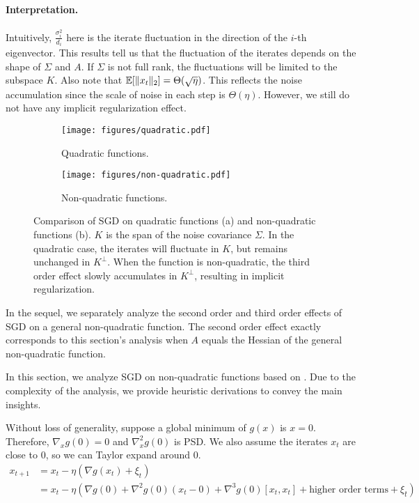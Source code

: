 \paragraph{Interpretation.} Intuitively, $\frac{\sigma_i^2}{d_i}$ here is the iterate fluctuation in the direction of the $i$-th eigenvector. This results tell us that the fluctuation of the iterates depends on the shape of $\Sigma$ and $A$. If $\Sigma$ is not full rank, the fluctuations will be limited to the subspace $K$. Also note that $\operatorname*{\mathbb{E}}[\|x_t\|_2] = \Theta(\sqrt{\eta})$. This reflects the noise accumulation since the scale of noise in each step is $\Theta({\eta})$. However, we still do not have any implicit regularization effect. 

\begin{figure}[ht]
\centering
 \begin{subfigure}[t]{0.45\textwidth}
        \texttt{[image: figures/quadratic.pdf]}
        \caption{Quadratic functions.}
        \label{lec17:fig:quadratic}
    \end{subfigure}
    \hfill
    \begin{subfigure}[t]{0.45\textwidth}
        \texttt{[image: figures/non-quadratic.pdf]}
        \caption{Non-quadratic functions.}
        \label{lec17:fig:non-quadratic}
    \end{subfigure}
   
\caption{Comparison of SGD on quadratic functions (a) and non-quadratic functions (b). $K$ is the span of the noise covariance $\Sigma$. In the quadratic case, the iterates will fluctuate in $K$, but remains unchanged in $K^\perp$. When the function is non-quadratic, the third order effect slowly accumulates in $K^\perp$, resulting in implicit regularization. } 
\label{lec17:fig:OU}
\end{figure}

In the sequel, we separately analyze the second order and third order effects of SGD on a general non-quadratic function. The second order effect exactly corresponds to this section's analysis when $A$ equals the Hessian of the general non-quadratic function.

In this section, we analyze SGD on non-quadratic functions based on \cite{damian2021label}. Due to the complexity of the analysis, we provide heuristic derivations to convey the main insights. 

Without loss of generality, suppose a global minimum of $g(x)$ is $x=0$. Therefore, $\nabla_x g(0) = 0$ and $\nabla_x^2 g(0)$ is PSD. We also  assume the iterates $x_t$ are close to $0$, so we can Taylor expand around $0$.
\begin{align}
x_{t+1} &= x_t - \eta(\nabla g(x_t) + \xi_t)\\
&= x_t - \eta(\nabla g(0) + \nabla^2g(0)(x_t - 0) + \nabla^3g(0)[x_t,x_t] + \text{higher order terms} + \xi_t). \label{lec17:eqn:full_gradient_update}
\end{align}

